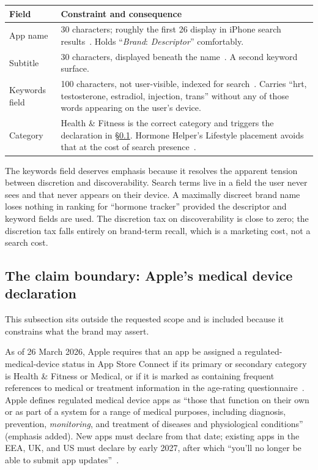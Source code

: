 \documentclass[11pt,a4paper]{article}
\begin{document}
\begin{longtable}{@{}L{4.6cm}L{10.6cm}@{}}
\toprule
\textbf{Field} & \textbf{Constraint and consequence} \\
\midrule
\endhead
App name & 30 characters; roughly the first 26 display in iPhone search
results~\cite{mobileaction}. Holds ``\emph{Brand}: \emph{Descriptor}''
comfortably. \\[0.35em]
Subtitle & 30 characters, displayed beneath the name~\cite{mobileaction}.
A second keyword surface. \\[0.35em]
Keywords field & 100 characters, not user-visible, indexed for
search~\cite{mobileaction}. Carries ``hrt, testosterone, estradiol,
injection, trans'' without any of those words appearing on the user's
device. \\[0.35em]
Category & Health \& Fitness is the correct category and triggers the
declaration in \S\ref{sec:deviceclaim}. Hormone Helper's Lifestyle
placement avoids that at the cost of search
presence~\cite{hormonehelper}. \\
\bottomrule
\end{longtable}

The keywords field deserves emphasis because it resolves the apparent
tension between discretion and discoverability. Search terms live in a
field the user never sees and that never appears on their device. A
maximally discreet brand name loses nothing in ranking for ``hormone
tracker'' provided the descriptor and keyword fields are used. The
discretion tax on discoverability is close to zero; the discretion tax
falls entirely on brand-term recall, which is a marketing cost, not a
search cost.

\subsection{The claim boundary: Apple's medical device declaration}
\label{sec:deviceclaim}

This subsection sits outside the requested scope and is included
because it constrains what the brand may assert.

As of 26 March 2026, Apple requires that an app be assigned a
regulated-medical-device status in App Store Connect if its primary or
secondary category is Health \& Fitness or Medical, or if it is marked
as containing frequent references to medical or treatment information
in the age-rating questionnaire~\cite{appledevice}. Apple defines
regulated medical device apps as ``those that function on their own or
as part of a system for a range of medical purposes, including
diagnosis, prevention, \emph{monitoring}, and treatment of diseases and
physiological conditions'' (emphasis added). New apps must declare from
that date; existing apps in the EEA, UK, and US must declare by early
2027, after which ``you'll no longer be able to submit app
updates''~\cite{appledevice}.
\end{document}
